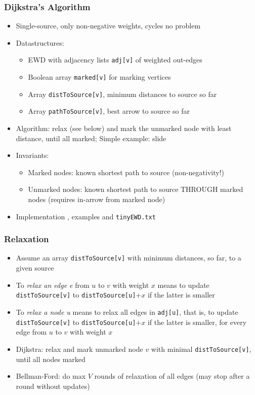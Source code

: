 \documentclass[handout]{beamer}
\newcommand{\git}{https://github.com/marcbezem/INF102/blob/master}
\begin{document}
\begin{frame}
    \frametitle{Dijkstra's Algorithm}

\begin{itemize}[<+->]
\item Single-source, only non-negative weights, cycles no problem
\item Datastructures:
  \begin{itemize}
  \item EWD with adjacency lists {\tt adj[v]} of weighted out-edges
  \item Boolean array {\tt marked[v]} for marking vertices
  \item Array {\tt distToSource[v]}, minimum distances to source so far
  \item Array {\tt pathToSource[v]}, best arrow to source so far
\end{itemize}
\item Algorithm: relax (see below) and mark the unmarked node with least distance, until all marked;
Simple example: slide \hyperlink{SPintro}{\color{red}{\pageref{SPintro}}}
\item Invariants:
\begin{itemize}[<+->]
  \item Marked nodes: known shortest path to source (non-negativity!)
  \item Unmarked nodes: known shortest path to source THROUGH marked nodes 
  (requires in-arrow from marked node)
  \end{itemize}
\item Implementation \href{\git/programs/graphs/LinkedListEWD.java}%
{\color{red}{\tt LinkedListEWD.slowEWD()}}, examples \href{\git/programs/myEWD.txt}%
{\color{red}{\tt myEWD.txt}} and {\tt tinyEWD.txt}
\end{itemize} 
\end{frame}

\begin{frame}
    \frametitle{Relaxation}
\begin{itemize}[<+->] 
\item Assume an  array  {\tt distToSource[v]} with
minimum distances, so far, to a given source
\item To \emph{relax an edge e} from $u$ to $v$ with weight $x$ means
to update {\tt distToSource[v]} to {\tt distToSource[u]}$+x$ if the latter is smaller
\item To \emph{relax a node u} means to relax all edges in {\tt adj[u]}, that is,
to update {\tt distToSource[v]} to {\tt distToSource[u]}$+x$ if the latter is smaller,
for every edge from $u$ to $v$ with weight $x$
\item Dijkstra: relax and mark unmarked node $v$ with minimal {\tt distToSource[v]},
until all nodes marked
\item Bellman-Ford: do max $V$ rounds of relaxation of all edges
(may stop after a round without updates)
\end{itemize} 
\end{frame}
\end{document}
